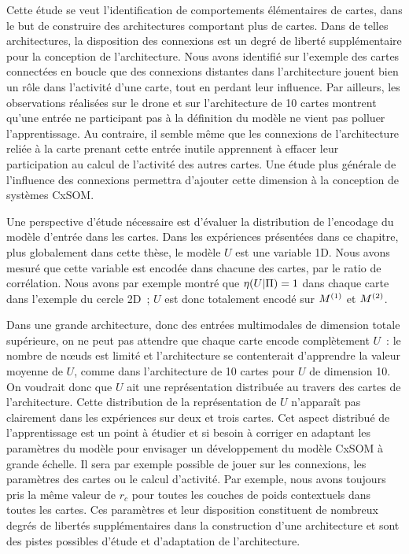 \documentclass[../main]{subfiles}
\begin{document}
Cette étude se veut l'identification de comportements élémentaires de cartes, dans le but de construire des architectures comportant plus de cartes. Dans de telles architectures, la disposition des connexions est un degré de liberté supplémentaire pour la conception de l'architecture.
Nous avons identifié sur l'exemple des cartes connectées en boucle que des connexions distantes dans l'architecture jouent bien un rôle dans l'activité d'une carte, tout en perdant leur influence. Par ailleurs, les observations réalisées sur le drone et sur l'architecture de 10 cartes montrent qu'une entrée ne participant pas à la définition du modèle ne vient pas polluer l'apprentissage. Au contraire, il semble même que les connexions de l'architecture reliée à la carte prenant cette entrée inutile apprennent à effacer leur participation au calcul de l'activité des autres cartes.
Une étude plus générale de l'influence des connexions permettra d'ajouter cette dimension à la conception de systèmes CxSOM.

Une perspective d'étude nécessaire est d'évaluer la distribution de l'encodage du modèle d'entrée dans les cartes. 
Dans les expériences présentées dans ce chapitre, plus globalement dans cette thèse, le modèle $U$ est une variable 1D. 
Nous avons mesuré que cette variable est encodée dans chacune des cartes, par le ratio de corrélation. Nous avons par exemple montré que $\eta(U|\Pi) = 1$ dans chaque carte dans l'exemple du cercle 2D~; $U$ est donc totalement encodé sur $M^{({1})}$ et $M^{({2})}$.

Dans une grande architecture, donc des entrées multimodales de dimension totale supérieure, on ne peut pas attendre que chaque carte encode complètement $U$~: le nombre de n\oe{}uds est limité et l'architecture se contenterait d'apprendre la valeur moyenne de $U$, comme dans l'architecture de 10 cartes pour $U$ de dimension 10.
On voudrait donc que $U$ ait une représentation distribuée au travers des cartes de l'architecture. 
Cette distribution de la représentation de $U$ n'apparaît pas clairement dans les expériences sur deux et trois cartes.
Cet aspect distribué de l'apprentissage est un point à étudier et si besoin à corriger en adaptant les paramètres du modèle pour envisager un développement du modèle CxSOM à grande échelle. Il sera par exemple possible de jouer sur les connexions, les paramètres des cartes ou le calcul d'activité.
Par exemple, nous avons toujours pris la  même valeur de $r_c$ pour toutes les couches de poids contextuels dans toutes les cartes. Ces paramètres et leur disposition constituent de nombreux degrés de libertés supplémentaires dans la construction d'une architecture et sont des pistes possibles d'étude et d'adaptation de l'architecture.
\end{document}
